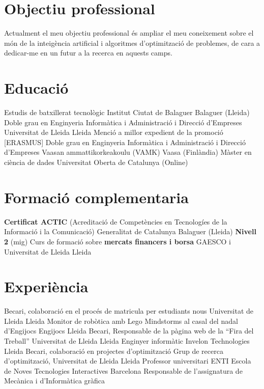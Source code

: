 \documentclass[a4paper,12pt,final]{moderncv}
\begin{document}
\makecvtitle

\section{Objectiu professional}
Actualment el meu objectiu professional és ampliar el meu coneixement
sobre el món de la inte\lgem igència artificial i algoritmes d'optimització
de problemes, de cara a dedicar-me en un futur a la recerca en aquests camps.

\section{Educació}
	{Estudis de batxillerat tecnològic}
	{Institut Ciutat de Balaguer}
	{Balaguer (Lleida)}
	{}
	{}
	{Doble grau en Enginyeria Informàtica i Administració i Direcció
		d'Empreses}
	{Universitat de Lleida}
	{Lleida}
	{Menció a millor expedient de la promoció}
	{}
	{[ERASMUS] Doble grau en Enginyeria Informàtica i
		Administració i Direcció d'Empreses}
	{Vaasan ammattikorkeakoulu (VAMK)}
	{Vaasa (Finlàndia)}
	{}
	{}
	{Màster en ciència de dades}
	{Universitat Oberta de Catalunya}
	{(Online)}
	{}
	{}

\section{Formació complementaria}
	{\textbf{Certificat ACTIC} (Acreditació de Competències en Tecnologíes de
		la Informació i la Comunicació)}
	{Generalitat de Catalunya}
	{Balaguer (Lleida)}
	{\textbf{Nivell 2} (mig)}
	{}
	{Curs de formació sobre \textbf{mercats financers i borsa}}
	{GAESCO i Universitat de Lleida}
	{Lleida}
	{}
	{}
	{}

\section{Experiència}
	{Becari, colaboració en el procés de matricula per estudiants nous}
	{Universitat de Lleida}
	{Lleida}
	{}
	{}
	{Monitor de robòtica amb Lego Mindstorms al casal del nadal d'Engijocs}
	{Engijocs}
	{Lleida}
	{}
	{}
	{Becari, Responsable de la pàgina web de la ``Fira del Treball''}
	{Universitat de Lleida}
	{Lleida}
	{}
	{}
	{Enginyer informàtic}
	{Invelon Technologies}
	{Lleida}
	{}
	{}
	{Becari, colaboració en projectes d'optimització}
	{Grup de recerca d'optimització, Universitat de Lleida}
	{Lleida}
	{}
	{}
	{Professor universitari}
	{ENTI Escola de Noves Tecnologies Interactives}
	{Barcelona}
	{}
	{Responsable de l'assignatura de Mecànica i d'Informàtica gràfica}
\end{document}
